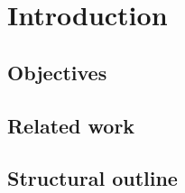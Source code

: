 {
\abnormalparskip{0pt}
\chapter{Introduction}
\label{cha:introduction}
}


\section{Objectives}
\label{sec:objectives}


\section{Related work}
\label{sec:related-work}


\section{Structural outline}
\label{sec:structural-outline}


\chapterbreak{}

